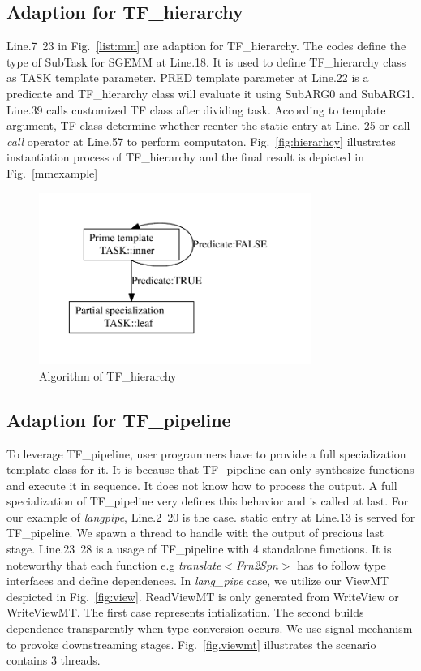\subsection{Adaption for TF\_hierarchy}
Line.7~23 in Fig.~\ref{list:mm} are adaption for TF\_hierarchy. The
codes define the type of SubTask for SGEMM at Line.18. It is used to define
TF\_hierarchy class as TASK template parameter. PRED template
parameter at Line.22 is a predicate and TF\_hierarchy class will evaluate it using SubARG0 and
SubARG1. Line.39 calls customized TF class after dividing
task. According to template argument, TF class determine whether
reenter the static entry at Line. 25 or call \textit{call} operator at
Line.57 to perform computaton. Fig.~\ref{fig:hierarhcy} illustrates
instantiation process of TF\_hierarchy and the final result is
depicted in Fig.~\ref{mmexample}
\begin{figure}[hpt]
\includegraphics[width=3.5in]{../algo}
\caption{Algorithm of TF\_hierarchy}\label{fig:hierarchy}
\end{figure}
\subsection{Adaption for TF\_pipeline}
To leverage TF\_pipeline, user programmers have to provide a full
specialization template class for it. It is because that TF\_pipeline
can only synthesize functions and execute it in sequence. It does not
know how to process the output. A full specialization of TF\_pipeline very defines
this behavior and is called at last. For our example of
\textit{langpipe}, Line.2~20 is the case. static entry at Line.13 is
served for TF\_pipeline. We spawn a thread to handle with the output of
precious last stage. Line.23~28 is a usage of TF\_pipeline with 4
standalone functions. It is noteworthy that each function e.g
\textit{translate$<$Frn2Spn$>$} has to follow type interfaces and
define dependences. In \textit{lang\_pipe} case, we utilize our ViewMT
despicted in Fig.~\ref{fig:view}. ReadViewMT is only generated from
WriteView or WriteViewMT. The first case represents intialization. The
second builds dependence transparently when type conversion occurs.
We use signal mechanism to provoke downstreaming
stages. Fig.~\ref{fig.viewmt} illustrates the scenario contains 3
threads.

